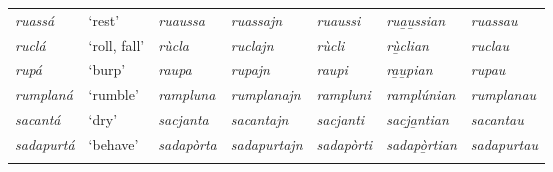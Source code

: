 \begin{sidewaystable}
\begin{tabularx}{\textwidth}{lllllll}
		\textit{ruassá} &`rest' & \textit{ruaussa} & \textit{ruassajn} & \textit{ruaussi} & \textit{rua̱u̱ssian} & \textit{ruassau}\\
		\textit{ruclá} & `roll, fall' & \textit{rùcla} & \textit{ruclajn} & \textit{rùcli} & \textit{rù̱clian} & \textit{ruclau}\\
		\textit{rupá} & `burp' & \textit{raupa} & \textit{rupajn} & \textit{raupi} & \textit{ra̱u̱pian} & \textit{rupau}\\
		\textit{rumplaná} & `rumble' & \textit{rampluna} & \textit{rumplanajn} & \textit{rampluni} & \textit{ramplúnian} & \textit{rumplanau} \\
		\textit{sacantá} & ‘dry’ & \textit{sacjanta} & \textit{sacantajn} & \textit{sacjanti} & \textit{sacj̱a̱ntian} & \textit{sacantau}\\
		\textit{sadapurtá} & ‘behave’ & \textit{sadapòrta} & \textit{sadapurtajn} & \textit{sadapòrti} & \textit{sadapò̱rtian} & \textit{sadapurtau}\\
			\lspbottomrule
		\end{tabularx}
\end{sidewaystable}


